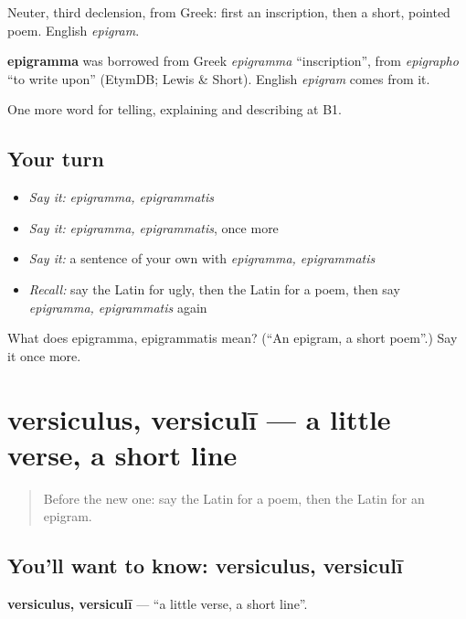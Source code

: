 Neuter, third declension, from Greek: first an inscription, then a short, pointed poem. English \emph{epigram}.

\begin{cousinweb}
\textbf{epigramma} was borrowed from Greek \emph{epigramma} \textquotedblleft{}inscription\textquotedblright{}, from \emph{epigrapho} \textquotedblleft{}to write upon\textquotedblright{} (EtymDB; Lewis \& Short). English \emph{epigram} comes from it.
\end{cousinweb}

\begin{grammarlens}[title={What you've built}]
One more word for telling, explaining and describing at B1.
\end{grammarlens}

\subsection*{Your turn}
\begin{itemize}
\raggedright
  \item \emph{Say it:} \emph{epigramma, epigrammatis}
  \item \emph{Say it:} \emph{epigramma, epigrammatis}, once more
  \item \emph{Say it:} a sentence of your own with \emph{epigramma, epigrammatis}
  \item \emph{Recall:} say the Latin for ugly, then the Latin for a poem, then say \emph{epigramma, epigrammatis} again
\end{itemize}

\begin{tcolorbox}[breakable,colback=teal!4,colframe=teal!35!black,title={Before you move on}]
What does epigramma, epigrammatis mean? (\textquotedblleft{}An epigram, a short poem\textquotedblright{}.) Say it once more.
\end{tcolorbox}
\section[versiculus, versiculī]{versiculus, versiculī — a little verse, a short line}

\label{lesson:LA-C549-versiculus}



\begin{quote}
Before the new one: say the Latin for a poem, then the Latin for an epigram.
\end{quote}

\subsection*{You'll want to know: versiculus, versiculī}
\textbf{versiculus, versiculī} — \textquotedblleft{}a little verse, a short line\textquotedblright{}.

